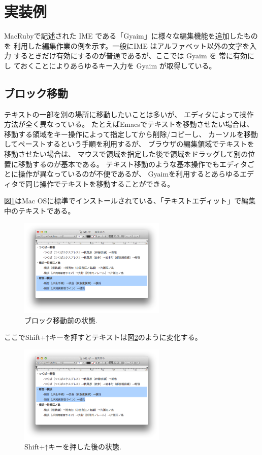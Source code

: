 \section{実装例}

MacRubyで記述された IME である「Gyaim」に様々な編集機能を追加したものを
利用した編集作業の例を示す。一般にIME はアルファベット以外の文字を入力
するときだけ有効にするのが普通であるが、ここでは Gyaim を 常に有効にし
ておくことによりあらゆるキー入力を Gyaim が取得している。

\subsection{ブロック移動}

テキストの一部を別の場所に移動したいことは多いが、
エディタによって操作方法が全く異なっている。
たとえばEmacsでテキストを移動させたい場合は、
移動する領域をキー操作によって指定してから削除/コピーし、
カーソルを移動してペーストするという手順を利用するが、
ブラウザの編集領域でテキストを移動させたい場合は、
マウスで領域を指定した後で領域をドラッグして別の位置に移動するのが基本である。
テキスト移動のような基本操作でもエディタごとに操作が異なっているのが不便であるが、
Gyaimを利用するとあらゆるエディタで同じ操作でテキストを移動することができる。

図\ref{move1}はMac OSに標準でインストールされている、「テキストエディット」で編集中のテキストである。

\begin{figure}[H]
\centerline{\includegraphics[width=70mm,bb=0 0 703 472]{figures/block2.png}}
\caption{ブロック移動前の状態.}
\label{move1}
\end{figure}

ここでShift+↑キーを押すとテキストは図\ref{move2}のように変化する。

\begin{figure}[H]
\centerline{\includegraphics[width=70mm,bb=0 0 703 472]{figures/block3.png}}
\caption{Shift+↑キーを押した後の状態.}
\label{move2}
\end{figure}

